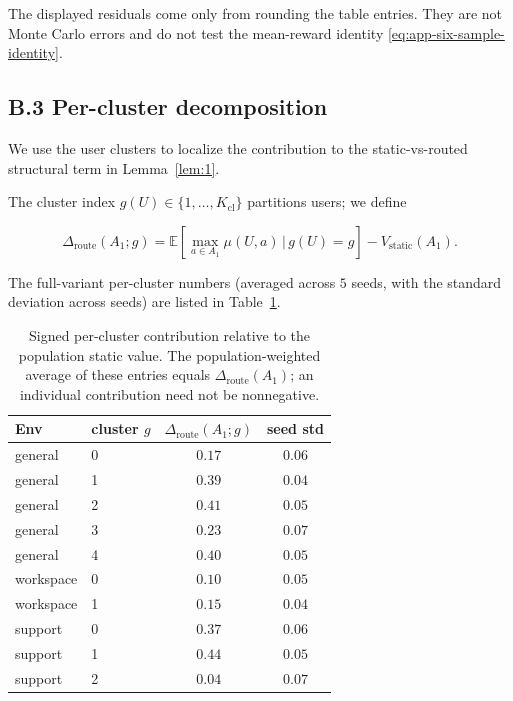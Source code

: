 \documentclass{article} %
\begin{document}
The displayed residuals come only from rounding the table entries. They are
not Monte Carlo errors and do not test the mean-reward identity
\eqref{eq:app-six-sample-identity}.

\subsection{B.3 Per-cluster decomposition}

\label{app:per-cluster}

We use the user clusters to localize the contribution to the static-vs-routed
structural term in Lemma~\ref{lem:1}.

The cluster index
\(g(U)\in\{1,\dots,K_{\mathrm{cl}}\}\) partitions users; we define

\begin{equation}
\label{eq:app-per-cluster-het}
\Delta_{\mathrm{route}}(A_1;g) = \mathbb{E}\!\left[\max_{a\in A_1}\mu(U,a)\,\bigg|\,g(U)=g\right] - V_{\mathrm{static}}(A_1).
\end{equation}

The full-variant per-cluster numbers (averaged across $5$ seeds, with the standard deviation across seeds) are listed in Table~\ref{tab:app-per-cluster}.

\begin{table}[h]
\centering
\footnotesize
\setlength{\tabcolsep}{4pt}
\begin{tabular}{llcc}
\toprule
Env & cluster $g$ & $\Delta_{\mathrm{route}}(A_1;g)$ & seed std \\
\midrule
general    & 0 & $0.17$ & $0.06$ \\
general    & 1 & $0.39$ & $0.04$ \\
general    & 2 & $0.41$ & $0.05$ \\
general    & 3 & $0.23$ & $0.07$ \\
general    & 4 & $0.40$ & $0.05$ \\
\midrule
workspace  & 0 & $0.10$ & $0.05$ \\
workspace  & 1 & $0.15$ & $0.04$ \\
\midrule
support    & 0 & $0.37$ & $0.06$ \\
support    & 1 & $0.44$ & $0.05$ \\
support    & 2 & $0.04$ & $0.07$ \\
\bottomrule
\end{tabular}
\caption{Signed per-cluster contribution relative to the population static
value. The population-weighted average of these entries equals
\(\Delta_{\mathrm{route}}(A_1)\); an individual contribution need not be
nonnegative.}
\label{tab:app-per-cluster}
\end{table}
\end{document}
